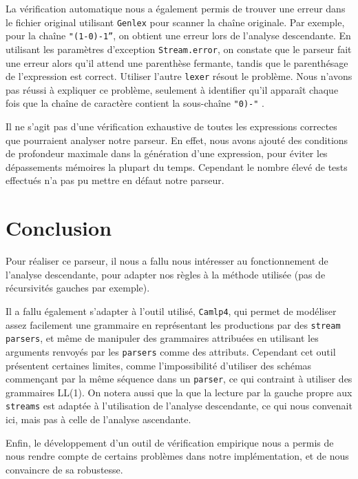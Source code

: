 \documentclass[11pt]{article}
\begin{document}
La vérification automatique nous a également permis de trouver une erreur dans le fichier original utilisant \texttt{Genlex} pour scanner la chaîne originale. Par exemple, pour la chaîne \texttt{"(1-0)-1''}, on obtient une erreur lors de l'analyse descendante. En utilisant les paramètres d'exception \texttt{Stream.error}, on constate que le parseur fait une erreur alors qu'il attend une parenthèse fermante, tandis que le parenthésage de l'expression est correct. Utiliser l'autre \texttt{lexer} résout le problème. Nous n'avons pas réussi à expliquer ce problème, seulement à identifier qu'il apparaît chaque fois que la chaîne de caractère contient la sous-chaîne \texttt{"0)-"} .


Il ne s'agit pas d'une vérification exhaustive de toutes les expressions correctes que pourraient analyser notre parseur. En effet, nous avons ajouté des conditions de profondeur maximale dans la génération d'une expression, pour éviter les dépassements mémoires la plupart du temps. Cependant le nombre élevé de tests effectués n'a pas pu mettre en défaut notre parseur. 

\section{Conclusion}
Pour réaliser ce parseur, il nous a fallu nous intéresser au fonctionnement de l'analyse descendante, pour adapter nos règles à la méthode utilisée (pas de récursivités gauches par exemple).

Il a fallu également s'adapter à l'outil utilisé, \texttt{Camlp4}, qui permet de modéliser assez facilement une grammaire en représentant les productions par des \texttt{stream parsers}, et même de manipuler des grammaires attribuées en utilisant les arguments renvoyés par les \texttt{parsers} comme des attributs. Cependant cet outil présentent certaines limites, comme l'impossibilité d'utiliser des schémas commençant par la même séquence dans un \texttt{parser}, ce qui contraint à utiliser des grammaires LL(1). On notera aussi que la que la lecture par la gauche propre aux \texttt{streams} est adaptée à l'utilisation de l'analyse descendante, ce qui nous convenait ici, mais pas à celle de l'analyse ascendante. 

Enfin, le développement d'un outil de vérification empirique nous a permis de nous rendre compte de certains problèmes dans notre implémentation, et de nous convaincre de sa robustesse.
\end{document}
